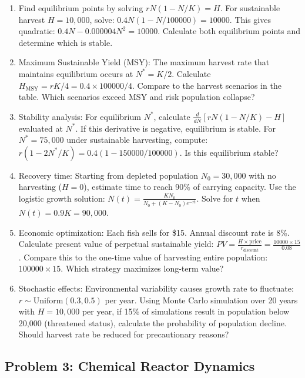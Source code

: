 \documentclass[12pt]{article}
\begin{document}
\begin{enumerate}[label=(\alph*)]
\item Find equilibrium points by solving $rN(1 - N/K) = H$. For sustainable harvest $H = 10,000$, solve: $0.4N(1 - N/100000) = 10000$. This gives quadratic: $0.4N - 0.000004N^2 = 10000$. Calculate both equilibrium points and determine which is stable.

\item Maximum Sustainable Yield (MSY): The maximum harvest rate that maintains equilibrium occurs at $N^* = K/2$. Calculate $H_{\text{MSY}} = rK/4 = 0.4 \times 100000 / 4$. Compare to the harvest scenarios in the table. Which scenarios exceed MSY and risk population collapse?

\item Stability analysis: For equilibrium $N^*$, calculate $\frac{d}{dN}[rN(1 - N/K) - H]$ evaluated at $N^*$. If this derivative is negative, equilibrium is stable. For $N^* = 75,000$ under sustainable harvesting, compute: $r(1 - 2N^*/K) = 0.4(1 - 150000/100000)$. Is this equilibrium stable?

\item Recovery time: Starting from depleted population $N_0 = 30,000$ with no harvesting ($H = 0$), estimate time to reach 90\% of carrying capacity. Use the logistic growth solution: $N(t) = \frac{K N_0}{N_0 + (K - N_0)e^{-rt}}$. Solve for $t$ when $N(t) = 0.9K = 90,000$.

\item Economic optimization: Each fish sells for \$15. Annual discount rate is 8\%. Calculate present value of perpetual sustainable yield: $PV = \frac{H \times \text{price}}{r_{\text{discount}}} = \frac{10000 \times 15}{0.08}$. Compare this to the one-time value of harvesting entire population: $100000 \times 15$. Which strategy maximizes long-term value?

\item Stochastic effects: Environmental variability causes growth rate to fluctuate: $r \sim \text{Uniform}(0.3, 0.5)$ per year. Using Monte Carlo simulation over 20 years with $H = 10,000$ per year, if 15\% of simulations result in population below 20,000 (threatened status), calculate the probability of population decline. Should harvest rate be reduced for precautionary reasons?
\end{enumerate}

\subsection*{Problem 3: Chemical Reactor Dynamics}
\end{document}
